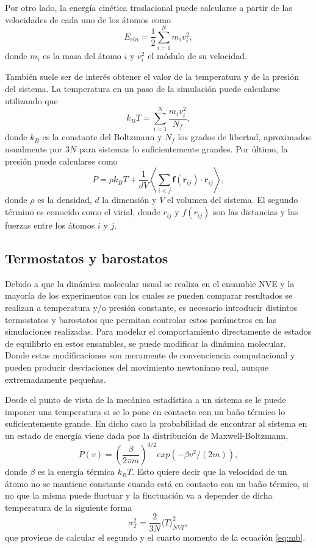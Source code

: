 Por otro lado, la energía cinética traslacional puede calcularse a partir de las
velocidades de cada uno de los átomos como
$$
E_{cin} = \frac{1}{2} \sum_{i=1}^{N} m_i v_i^2, 
$$
donde $m_i$ es la masa del átomo $i$ y $v_i^2$ el módulo de su velocidad. 

También suele ser de interés obtener el valor de la temperatura y de la presión
del sistema. La temperatura en un paso de la simulación puede calcularse 
utilizando que
\begin{equation}\label{eq:tempvel}
    k_B T = \sum_{i=1}^N \frac{m_i v_i^2}{N_f},
\end{equation}
donde $k_B$ es la constante del Boltzmann y $N_f$ los grados de libertad,
aproximados usualmente por $3N$ para sistemas lo suficientemente grandes. Por 
último, la presión puede calcularse como 
$$
P = \rho k_B T + \frac{1}{d V} \left\langle \sum_{i<j} \mathbf{f}(\mathbf{r}_{ij}) \cdot \mathbf{r}_{ij} \right\rangle,
$$
donde $\rho$ es la densidad, $d$ la dimensión y $V$ el volumen del sistema. El
segundo término es conocido como el virial, donde $r_{ij}$ y $f(r_{ij})$ son las 
distancias y las fuerzas entre los átomos $i$ y $j$.

\subsection{Termostatos y barostatos}

Debido a que la dinámica molecular usual se realiza en el ensamble NVE y la 
mayoría de los experimentos con los cuales se pueden comparar resultados se 
realizan a temperatura y/o presión constante, es necesario introducir distintos
termostatos y barostatos que permitan controlar estos parámetros en las 
simulaciones realizadas. Para modelar el comportamiento directamente de estados
de equilibrio en estos ensambles, se puede modificar la dinámica molecular. Donde
estas modificaciones son meramente de convenciencia computacional y pueden producir 
desviaciones del movimiento newtoniano real, aunque extremadamente pequeñas.

Desde el punto de vista de la mecánica estadística a un sistema se le puede 
imponer una temperatura si se lo pone en contacto con un baño térmico lo 
suficientemente grande. En dicho caso la probabilidad de encontrar al sistema en
un estado de energía viene dada por la distribución de Maxwell-Boltzmann,
\begin{equation}\label{eq:mb}
P(v) = \left( \frac{\beta}{2\pi m} \right)^{3/2} exp(-\beta v^2 / (2m)),
\end{equation}
donde $\beta$ es la energía térmica $k_BT$. Esto quiere decir que la velocidad de
un átomo no se mantiene constante cuando está en contacto con un baño térmico, si 
no que la misma puede fluctuar y la fluctuación va a depender de dicha temperatura
de la siguiente forma
$$
\sigma_T^2 = \frac{2}{3 N} \langle T \rangle_{NVT}^2,
$$
que proviene de calcular el segundo y el cuarto momento de la ecuación \ref{eq:mb}.

